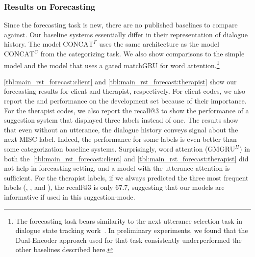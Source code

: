 \subsubsection{Results on Forecasting}
\label{sssec:snt:results-forecasting}
Since the forecasting task is new, there are no published baselines to
compare against. Our baseline systems essentially differ in their
representation of dialogue history. The model $\text{CONCAT}^{F}$ uses
the same architecture as the model $\text{CONCAT}^{C}$ from the
categorizing task. We also show comparisons to the simple \HGRU model
and the \GMGRUH model that uses a gated matchGRU for word
attention.\footnote{The forecasting task bears similarity to the next
  utterance selection task in dialogue state tracking
  work~\cite{DSTC7}. In preliminary experiments, we found that the
  Dual-Encoder approach used for that task consistently underperformed
  the other baselines described here.}

\autoref{tbl:main_rst_forecast:client} and
\autoref{tbl:main_rst_forecast:therapist} show our forecasting results
for client and therapist, respectively. For client codes, we also
report the \CHANGE and \SUSTAIN performance on the development set
because of their importance.  For the therapist codes, we also report
the recall@3 to show the performance of a suggestion system that
displayed three labels instead of one.
%
The results show that even without an utterance, the dialogue history
conveys signal about the next MISC label. Indeed, the performance for
some labels is even better than some categorization baseline
systems. Surprisingly, word attention ($\text{GMGRU}^{H}$) in both
the~\autoref{tbl:main_rst_forecast:client} and
\autoref{tbl:main_rst_forecast:therapist} did not help in forecasting
setting, and a model with the \self utterance attention is
sufficient. For the therapist labels, if we always predicted the three
most frequent labels (\FA, \GI, and \RES), the recall@3 is only 67.7,
suggesting that our models are informative if used in this
suggestion-mode.

